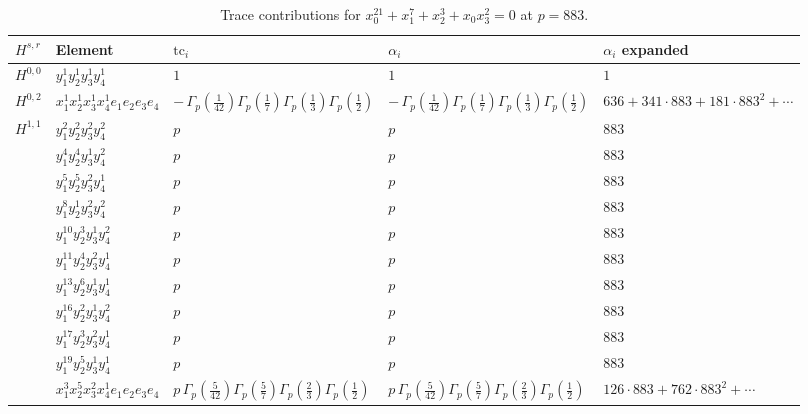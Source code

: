 \documentclass[11pt]{article}
\begin{document}
\begin{table}[ht]
\centering
\caption{Trace contributions for $x_0^{21} + x_1^{7} + x_2^{3} + x_0 x_3^{2} = 0$ at $p=883$.}\label{tab:deformed-57}
\renewcommand{\arraystretch}{1.1}
{\scriptsize
\begin{tabular}{@{}lllll@{}}
\toprule
$H^{s,r}$ & Element & $\mathrm{tc}_i$ & $\alpha_i$ & $\alpha_i$ expanded \\
\midrule
$H^{0,0}$ & $y_{1}^{1} y_{2}^{1} y_{3}^{1} y_{4}^{1}$ & $1$ & $1$ & $1$ \\
\midrule
$H^{0,2}$ & $x_{1}^{1} x_{2}^{1} x_{3}^{1} x_{4}^{1}  e_{1} e_{2} e_{3} e_{4}$ & $- \, \Gamma_p \left( \frac{1}{42} \right) \Gamma_p \left( \frac{1}{7} \right) \Gamma_p \left( \frac{1}{3} \right) \Gamma_p \left( \frac{1}{2} \right)$ & $- \, \Gamma_p \left( \frac{1}{42} \right) \Gamma_p \left( \frac{1}{7} \right) \Gamma_p \left( \frac{1}{3} \right) \Gamma_p \left( \frac{1}{2} \right)$ & $636{+}341{\cdot}883{+}181{\cdot}883^{2}{+}\cdots$ \\
\midrule
$H^{1,1}$ & $y_{1}^{2} y_{2}^{2} y_{3}^{2} y_{4}^{2}$ & $p \,$ & $p \,$ & $883$ \\
 & $y_{1}^{4} y_{2}^{4} y_{3}^{1} y_{4}^{2}$ & $p \,$ & $p \,$ & $883$ \\
 & $y_{1}^{5} y_{2}^{5} y_{3}^{2} y_{4}^{1}$ & $p \,$ & $p \,$ & $883$ \\
 & $y_{1}^{8} y_{2}^{1} y_{3}^{2} y_{4}^{2}$ & $p \,$ & $p \,$ & $883$ \\
 & $y_{1}^{10} y_{2}^{3} y_{3}^{1} y_{4}^{2}$ & $p \,$ & $p \,$ & $883$ \\
 & $y_{1}^{11} y_{2}^{4} y_{3}^{2} y_{4}^{1}$ & $p \,$ & $p \,$ & $883$ \\
 & $y_{1}^{13} y_{2}^{6} y_{3}^{1} y_{4}^{1}$ & $p \,$ & $p \,$ & $883$ \\
 & $y_{1}^{16} y_{2}^{2} y_{3}^{1} y_{4}^{2}$ & $p \,$ & $p \,$ & $883$ \\
 & $y_{1}^{17} y_{2}^{3} y_{3}^{2} y_{4}^{1}$ & $p \,$ & $p \,$ & $883$ \\
 & $y_{1}^{19} y_{2}^{5} y_{3}^{1} y_{4}^{1}$ & $p \,$ & $p \,$ & $883$ \\
 & $x_{1}^{3} x_{2}^{5} x_{3}^{2} x_{4}^{1}  e_{1} e_{2} e_{3} e_{4}$ & $p \, \Gamma_p \left( \frac{5}{42} \right) \Gamma_p \left( \frac{5}{7} \right) \Gamma_p \left( \frac{2}{3} \right) \Gamma_p \left( \frac{1}{2} \right)$ & $p \, \Gamma_p \left( \frac{5}{42} \right) \Gamma_p \left( \frac{5}{7} \right) \Gamma_p \left( \frac{2}{3} \right) \Gamma_p \left( \frac{1}{2} \right)$ & $126{\cdot}883{+}762{\cdot}883^{2}{+}\cdots$ \\

\end{tabular}}
\end{table}
\end{document}
